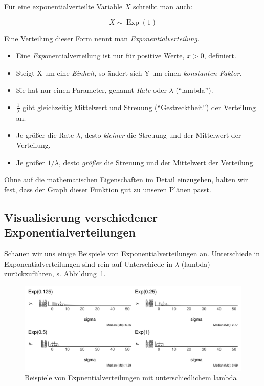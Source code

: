 \documentclass[
  a4paper,
  DIV=11]{scrreprt}
\providecommand{\tightlist}{%
  \setlength{\itemsep}{0pt}\setlength{\parskip}{0pt}}\usepackage{longtable,booktabs,array}
\theoremstyle{definition}
\theoremstyle{remark}
\begin{document}
Für eine exponentialverteilte Variable \(X\) schreibt man auch:

\[X \sim \operatorname{Exp}(1)\]

Eine Verteilung dieser Form nennt man \emph{Exponentialverteilung}.

\begin{itemize}
\tightlist
\item
  Eine \emph{Exp}onentialverteilung ist nur für positive Werte, \(x>0\),
  definiert.
\item
  Steigt X um eine \emph{Einheit}, so ändert sich Y um einen
  \emph{konstanten Faktor}.
\item
  Sie hat nur einen Parameter, genannt \emph{Rate} oder \(\lambda\)
  (``lambda'').
\item
  \(\frac{1}{\lambda}\) gibt gleichzeitig Mittelwert und Streuung
  (``Gestrecktheit'') der Verteilung an.
\item
  Je größer die Rate \(\lambda\), desto \emph{kleiner} die Streuung und
  der Mittelwert der Verteilung.
\item
  Je größer \(1/\lambda\), desto \emph{größer} die Streuung und der
  Mittelwert der Verteilung.
\end{itemize}

Ohne auf die mathematischen Eigenschaften im Detail einzugehen, halten
wir fest, dass der Graph dieser Funktion gut zu unseren Plänen passt.

\hypertarget{visualisierung-verschiedener-exponentialverteilungen}{%
\subsection{Visualisierung verschiedener
Exponentialverteilungen}\label{visualisierung-verschiedener-exponentialverteilungen}}

Schauen wir uns einige Beispiele von Exponentialverteilungen an.
Unterschiede in Exponentialverteilungen sind rein auf Unterschiede in
\(\lambda\) (lambda) zurückzuführen, s. Abbildung~\ref{fig-exps}.

\begin{figure}

{\centering \includegraphics{./gauss_files/figure-pdf/fig-exps-1.pdf}

}

\caption{\label{fig-exps}Beispiele von Expnentialverteilungen mit
unterschiedlichem lambda}

\end{figure}
\end{document}
